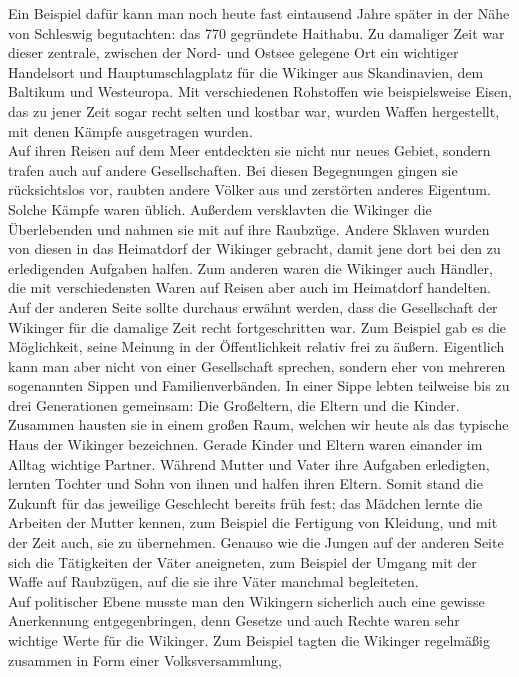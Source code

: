 \documentclass[12pt,a4paper,ngerman,openany]{book}
\begin{document}
Ein Beispiel dafür kann man noch heute fast eintausend Jahre später in der Nähe von Schleswig begutachten: das 770 gegründete Haithabu. Zu damaliger Zeit war dieser zentrale,
zwischen der Nord- und Ostsee gelegene Ort ein wichtiger Handelsort und Hauptumschlagplatz für die Wikinger aus Skandinavien, dem Baltikum und Westeuropa. Mit verschiedenen Rohstoffen wie beispielsweise Eisen,
das zu jener Zeit sogar recht selten und kostbar war, wurden Waffen hergestellt, mit denen Kämpfe ausgetragen wurden.\\ 
Auf ihren Reisen auf dem Meer entdeckten sie nicht nur neues Gebiet, sondern trafen auch auf andere Gesellschaften. Bei diesen Begegnungen gingen sie rücksichtslos vor, raubten andere Völker aus und zerstörten anderes Eigentum.
Solche Kämpfe waren üblich. Außerdem versklavten die Wikinger die Überlebenden und nahmen sie mit auf ihre Raubzüge. Andere Sklaven wurden von diesen in das Heimatdorf der Wikinger gebracht, damit jene dort bei den zu erledigenden Aufgaben halfen.
Zum anderen waren die Wikinger auch Händler, die mit verschiedensten Waren auf Reisen aber auch im Heimatdorf handelten.\\
Auf der anderen Seite sollte durchaus erwähnt werden, dass die Gesellschaft der Wikinger für die damalige Zeit recht fortgeschritten war. Zum Beispiel gab es die Möglichkeit, seine Meinung in der Öffentlichkeit relativ frei zu äußern.
Eigentlich kann man aber nicht von einer Gesellschaft sprechen, sondern eher von mehreren sogenannten Sippen und Familienverbänden. In einer Sippe lebten teilweise bis zu drei Generationen gemeinsam: Die Großeltern, die Eltern und die Kinder.
Zusammen hausten sie in einem großen Raum, welchen wir heute als das typische Haus der Wikinger bezeichnen. Gerade Kinder und Eltern waren einander im Alltag wichtige Partner. Während Mutter und Vater ihre Aufgaben erledigten,
lernten Tochter und Sohn von ihnen und halfen ihren Eltern. Somit stand die Zukunft für das jeweilige Geschlecht bereits früh fest; das Mädchen lernte die Arbeiten der Mutter kennen, zum Beispiel die Fertigung von Kleidung, und mit der Zeit auch, sie zu übernehmen.
Genauso wie die Jungen auf der anderen Seite sich die Tätigkeiten der Väter aneigneten, zum Beispiel der Umgang mit der Waffe auf Raubzügen, auf die sie ihre Väter manchmal begleiteten.\\
Auf politischer Ebene musste man den Wikingern sicherlich auch eine gewisse Anerkennung entgegenbringen, denn Gesetze und auch Rechte waren sehr wichtige Werte für die Wikinger. Zum Beispiel tagten die Wikinger regelmäßig zusammen in Form einer Volksversammlung,
\end{document}
